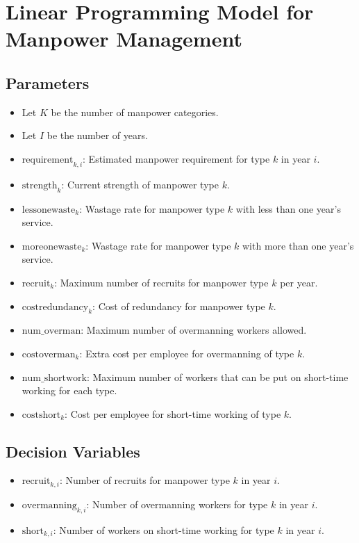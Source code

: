 \documentclass{article}
\begin{document}
\section*{Linear Programming Model for Manpower Management}

\subsection*{Parameters}

\begin{itemize}
    \item Let \( K \) be the number of manpower categories.
    \item Let \( I \) be the number of years.
    \item \( \text{requirement}_{k,i} \): Estimated manpower requirement for type \( k \) in year \( i \).
    \item \( \text{strength}_{k} \): Current strength of manpower type \( k \).
    \item \( \text{lessonewaste}_{k} \): Wastage rate for manpower type \( k \) with less than one year's service.
    \item \( \text{moreonewaste}_{k} \): Wastage rate for manpower type \( k \) with more than one year's service.
    \item \( \text{recruit}_{k} \): Maximum number of recruits for manpower type \( k \) per year.
    \item \( \text{costredundancy}_{k} \): Cost of redundancy for manpower type \( k \).
    \item \( \text{num\_overman} \): Maximum number of overmanning workers allowed.
    \item \( \text{costoverman}_{k} \): Extra cost per employee for overmanning of type \( k \).
    \item \( \text{num\_shortwork} \): Maximum number of workers that can be put on short-time working for each type.
    \item \( \text{costshort}_{k} \): Cost per employee for short-time working of type \( k \).
\end{itemize}

\subsection*{Decision Variables}

\begin{itemize}
    \item \( \text{recruit}_{k,i} \): Number of recruits for manpower type \( k \) in year \( i \).
    \item \( \text{overmanning}_{k,i} \): Number of overmanning workers for type \( k \) in year \( i \).
    \item \( \text{short}_{k,i} \): Number of workers on short-time working for type \( k \) in year \( i \).
\end{itemize}
\end{document}
